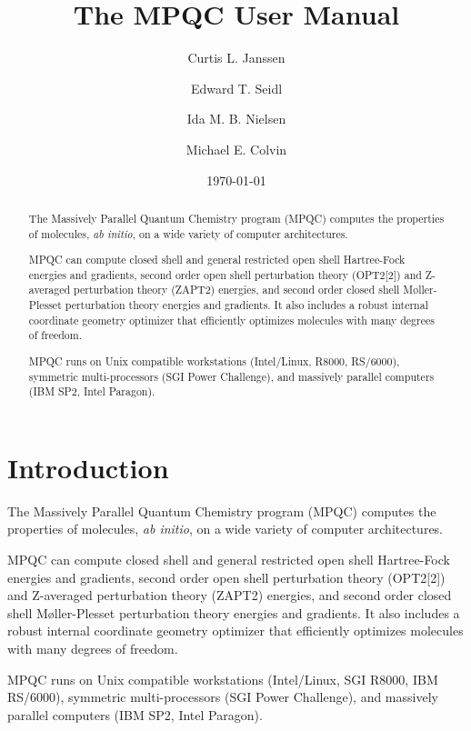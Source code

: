 \documentclass{report}
\begin{document}
\title{The MPQC User Manual}

\author{Curtis L. Janssen \and Edward T. Seidl \and Ida M. B. Nielsen
        \and Michael E. Colvin}

\date{\today}

\maketitle

\begin{abstract}
The Massively Parallel Quantum Chemistry program (MPQC) computes
the properties of molecules, {\it ab initio}, on a wide variety
of computer architectures.

MPQC can compute closed shell and general restricted open shell
Hartree-Fock energies and gradients, second order open shell
perturbation theory (OPT2[2]) and Z-averaged perturbation theory
(ZAPT2) energies, and second order closed shell M\o{}ller-Plesset
perturbation theory energies and gradients.  It also includes a
robust internal coordinate geometry optimizer that efficiently
optimizes molecules with many degrees of freedom.

MPQC runs on Unix compatible workstations (Intel/Linux, R8000,
RS/6000), symmetric multi-processors (SGI Power Challenge), and
massively parallel computers (IBM SP2, Intel Paragon).
\end{abstract}

\tableofcontents

\chapter{Introduction}
The Massively Parallel Quantum Chemistry program (MPQC) computes
the properties of molecules, {\it ab initio}, on a wide variety
of computer architectures.

MPQC can compute closed shell and general restricted open shell
Hartree-Fock energies and gradients, second order open shell
perturbation theory (OPT2[2]) and Z-averaged perturbation theory
(ZAPT2) energies, and second order closed shell M\o{}ller-Plesset
perturbation theory energies and gradients.  It also includes a
robust internal coordinate geometry optimizer that efficiently
optimizes molecules with many degrees of freedom.

MPQC runs on Unix compatible workstations (Intel/Linux, SGI R8000,
IBM RS/6000), symmetric multi-processors (SGI Power Challenge),
and massively parallel computers (IBM SP2, Intel Paragon).
\end{document}
